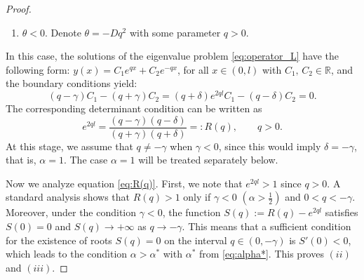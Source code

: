 \documentclass{mpi2015-cscpreprint}
\numberwithin{equation}{section}
\begin{document}
\begin{proof}
\begin{enumerate}
    \item[2)] $\theta<0$. Denote $\theta=-Dq^2$ with some parameter $q>0$.
\end{enumerate}
 In this case, the solutions of the eigenvalue problem \eqref{eq:operator_L} have the following form: 
$
y(x)=C_1e^{qx}+C_2e^{-qx}$, for all 
$x \in (0,l)$ with $C_1,\,C_2\in\mathbb{R}$,
and the boundary conditions yield:
\begin{equation}\label{eq:BC_nu<0}
(q-\gamma)C_1-(q+\gamma)C_2= 
(q+\delta)e^{2ql}C_1-(q-\delta)C_2=0.
\end{equation}
The corresponding determinant condition can be written as
\begin{equation}\label{eq:R(q)}
e^{2ql}=\frac{(q-\gamma)(q-\delta)}{(q+\gamma)(q+\delta)}=:R(q), \qquad q>0.
\end{equation}
At this stage, we assume that $q\neq -\gamma$ when $\gamma<0$, since this would imply
$\delta=-\gamma$, that is, $\alpha=1$. The case $\alpha=1$ will be treated separately below.

Now we analyze equation \eqref{eq:R(q)}. First, we note that $e^{2ql}>1$ since $q>0$. A standard analysis shows that $R(q)>1$ only if $\gamma<0$ $\left(\alpha>\frac{1}{2}\right)$ and $0<q<-\gamma$. Moreover, under the condition $\gamma<0$, the function $S(q):=R(q)-e^{2ql}$ satisfies $S(0)=0$ and $S(q)\to+\infty$ as $q\to-\gamma$. This means that a sufficient condition for the existence of roots $S(q)=0$ on the interval $q\in(0,-\gamma)$ is $S'(0)<0$, which leads to the condition $\alpha>\alpha^*$ with $\alpha^*$ from \eqref{eq:alpha*}.
%
%
This proves $(ii)$ and $(iii)$.


\end{proof}
\end{document}

